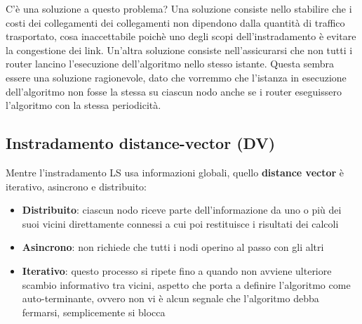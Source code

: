 \documentclass[11pt,a4paper]{book}
\begin{document}
C'è una soluzione a questo problema? Una soluzione consiste nello stabilire che i costi dei collegamenti dei collegamenti non dipendono dalla quantità di traffico trasportato, cosa inaccettabile poichè uno degli scopi dell'instradamento è evitare la congestione dei link. Un'altra soluzione consiste nell'assicurarsi che non tutti i router lancino l'esecuzione dell'algoritmo nello stesso istante. Questa sembra essere una soluzione ragionevole, dato che vorremmo che l'istanza in esecuzione dell'algoritmo non fosse la stessa su ciascun nodo anche se i router eseguissero l'algoritmo con la stessa periodicità.

\subsection{Instradamento distance-vector (DV)}
Mentre l'instradamento LS usa informazioni globali, quello \textbf{distance vector} è iterativo, asincrono e distribuito:
\begin{itemize}
	\item \textbf{Distribuito}: ciascun nodo riceve parte dell'informazione da uno o più dei suoi vicini direttamente connessi a cui poi restituisce i risultati dei calcoli
	\item \textbf{Asincrono}: non richiede che tutti i nodi operino al passo con gli altri
	\item \textbf{Iterativo}: questo processo si ripete fino a quando non avviene ulteriore scambio informativo tra vicini, aspetto che porta a definire l'algoritmo come auto-terminante, ovvero non vi è alcun segnale che l'algoritmo debba fermarsi, semplicemente si blocca
\end{itemize}
\end{document}
